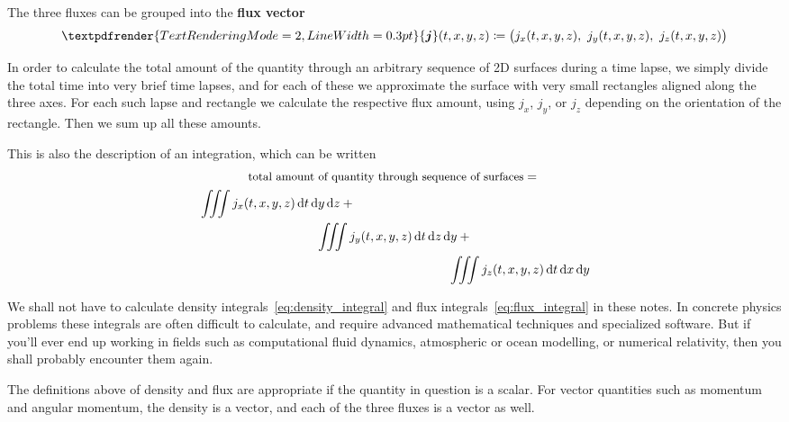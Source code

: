 \documentclass[a4paper,12pt,%
onecolumn,oneside,titlepage,%
british%
]{memoir}
\renewcommand*{\bm}[1]{\textpdfrender{TextRenderingMode=2,LineWidth=0.3pt}{\boldsymbol{#1}}}
\newcommand*{\di}{\mathrm{d}}%
\newcommand*{\defd}{\coloneqq}
\renewcommand*{\|}[1][]{\nonscript\:#1\vert\nonscript\:\mathopen{}}
\newcommand*{\yN}{N}
\newcommand*{\yJ}{J}
\begin{document}
The three fluxes can be grouped into the \textbf{flux vector}
\begin{equation}
  \label{eq:flux_vector}
  \bm{j}(t,x,y,z) \defd
  \bigl(j_{x}(t,x,y,z),\ j_{y}(t,x,y,z),\ j_{z}(t,x,y,z)\bigr)
\end{equation}

In order to calculate the total amount of the quantity through an arbitrary sequence of 2D surfaces during a time lapse, we simply divide the total time into very brief time lapses, and for each of these we approximate the surface with very small rectangles aligned along the three axes. For each such lapse and rectangle we calculate the respective flux amount, using $j_{x}$, $j_{y}$, or $j_{z}$ depending on the orientation of the rectangle. Then we sum up all these amounts.
\begin{extra}
  This is also the description of an integration, which can be written
  \begin{multline}
    \label{eq:flux_integral}
    \text{\small total amount of quantity through sequence of surfaces} = {}\\
    \begin{multlined}[b][0.9\linewidth]
      \iiint j_{x}(t,x,y,z)\, \di t\, \di y\, \di z +{}
      \\\iiint j_{y}(t,x,y,z)\, \di t\, \di z\, \di y +{}
      \\\iiint j_{z}(t,x,y,z)\, \di t\, \di x\, \di y
    \end{multlined}
  \end{multline}

  We shall not have to calculate density integrals~\eqref{eq:density_integral} and flux integrals~\eqref{eq:flux_integral} in these notes. In concrete physics problems these integrals are often difficult to calculate, and require advanced mathematical techniques and specialized software. But if you'll ever end up working in fields such as computational fluid dynamics, atmospheric or ocean modelling, or numerical relativity, then you shall probably encounter them again.
\end{extra}

\medskip

The definitions above of density and flux are appropriate if the quantity in question is a scalar. For vector quantities such as momentum and angular momentum, the density is a vector, and each of the three fluxes is a vector as well.
\end{document}
